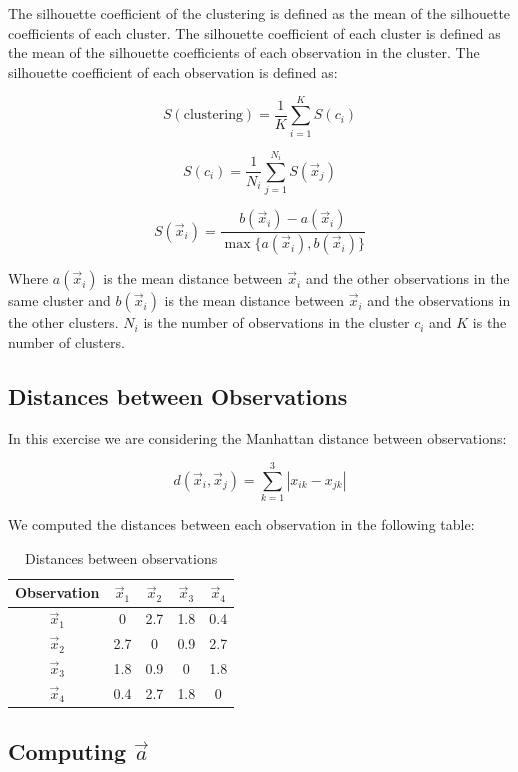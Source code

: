 \documentclass{article}
\begin{document}
The silhouette coefficient of the clustering is defined as the mean of the silhouette coefficients of each cluster. The silhouette coefficient of each cluster is defined as the mean of the silhouette coefficients of each observation in the cluster. The silhouette coefficient of each observation is defined as:

\[ S(\text{clustering}) = \frac{1}{K} \sum_{i=1}^K S(c_i) \]

\[ S(c_i) = \frac{1}{N_i} \sum_{j=1}^{N_i} S(\vec{x}_j) \]

\[ S(\vec{x}_i) = \frac{b(\vec{x}_i) - a(\vec{x}_i)}{\max \{ a(\vec{x}_i), b(\vec{x}_i) \}} \]

Where $a(\vec{x}_i)$ is the mean distance between $\vec{x}_i$ and the other observations in the same cluster and $b(\vec{x}_i)$ is the mean distance between $\vec{x}_i$ and the observations in the other clusters. $N_i$ is the number of observations in the cluster $c_i$ and $K$ is the number of clusters.

\subsection*{Distances between Observations}

In this exercise we are considering the Manhattan distance between observations:

\[ d(\vec{x}_i, \vec{x}_j) = \sum_{k=1}^3 |x_{ik} - x_{jk}| \]

We computed the distances between each observation in the following table:

\begin{table}[h!]
  \centering
  \begin{tabular}{c|c|c|c|c}
    Observation & $\vec{x}_1$ & $\vec{x}_2$ & $\vec{x}_3$ & $\vec{x}_4$ \\ \hline
    $\vec{x}_1$ & 0 & 2.7 & 1.8 & 0.4 \\ \hline
    $\vec{x}_2$ & 2.7 & 0 & 0.9 & 2.7 \\ \hline
    $\vec{x}_3$ & 1.8 & 0.9 & 0 & 1.8 \\ \hline
    $\vec{x}_4$ & 0.4 & 2.7 & 1.8 & 0 \\ 
  \end{tabular}
  \caption{Distances between observations}
  \label{tab:distances}
\end{table}

\subsection*{Computing $\vec{a}$}
\end{document}
